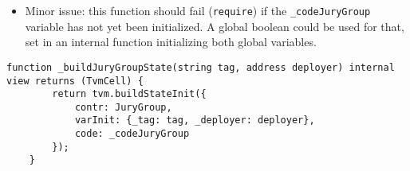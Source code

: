 \begin{itemize}
\item Minor issue: this function should fail ({\tt require}) if the
  {\tt \_codeJuryGroup} variable has not yet been initialized. A global
  boolean could be used for that, set in an internal function
  initializing both global variables.
\end{itemize}

\begin{lstlisting}[firstnumber=14]
    function _buildJuryGroupState(string tag, address deployer) internal view returns (TvmCell) {
        return tvm.buildStateInit({
            contr: JuryGroup,
            varInit: {_tag: tag, _deployer: deployer},
            code: _codeJuryGroup
        });
    }
\end{lstlisting}
